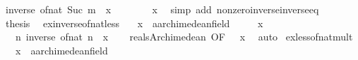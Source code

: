 \begin{isabellebody}
\ {\isachardoublequoteopen}inverse\ {\isacharparenleft}{\kern0pt}of{\isacharunderscore}{\kern0pt}nat\ {\isacharparenleft}{\kern0pt}Suc\ m{\isacharparenright}{\kern0pt}{\isacharparenright}{\kern0pt}\ {\isacharless}{\kern0pt}\ x{\isachardoublequoteclose}\isanewline
\ \ \ \ \isamarkupfalse%
\ {\isacartoucheopen}{}\ {\isacharless}{\kern0pt}\ x{\isacartoucheclose}\ \isamarkupfalse%
\ {\isacharparenleft}{\kern0pt}simp\ add{\isacharcolon}{\kern0pt}\ nonzero{\isacharunderscore}{\kern0pt}inverse{\isacharunderscore}{\kern0pt}inverse{\isacharunderscore}{\kern0pt}eq{\isacharparenright}{\kern0pt}\isanewline
\ \ \isamarkupfalse%
\ \isamarkupfalse%
\ {\isacharquery}{\kern0pt}thesis\ \isacommand{{\isachardot}{\kern0pt}{\isachardot}{\kern0pt}}\isamarkupfalse%
\isanewline
{}\isamarkupfalse%
%
\endisatagproof
{\isafoldproof}%
%
\isadelimproof
\isanewline
%
\endisadelimproof
\isanewline
{}\isamarkupfalse%
\ ex{\isacharunderscore}{\kern0pt}inverse{\isacharunderscore}{\kern0pt}of{\isacharunderscore}{\kern0pt}nat{\isacharunderscore}{\kern0pt}less{\isacharcolon}{\kern0pt}\isanewline
\ \ \ x\ {\isacharcolon}{\kern0pt}{\isacharcolon}{\kern0pt}\ {\isachardoublequoteopen}{\isacharprime}{\kern0pt}a{\isacharcolon}{\kern0pt}{\isacharcolon}{\kern0pt}archimedean{\isacharunderscore}{\kern0pt}field{\isachardoublequoteclose}\isanewline
\ \ \ {\isachardoublequoteopen}{}\ {\isacharless}{\kern0pt}\ x{\isachardoublequoteclose}\isanewline
\ \ \ {\isachardoublequoteopen}{\isasymexists}n{\isachargreater}{\kern0pt}{}{\isachardot}{\kern0pt}\ inverse\ {\isacharparenleft}{\kern0pt}of{\isacharunderscore}{\kern0pt}nat\ n{\isacharparenright}{\kern0pt}\ {\isacharless}{\kern0pt}\ x{\isachardoublequoteclose}\isanewline
%
\isadelimproof
\ \ %
\endisadelimproof
%
\isatagproof
{}\isamarkupfalse%
\ reals{\isacharunderscore}{\kern0pt}Archimedean\ {\isacharbrackleft}{\kern0pt}OF\ {\isacartoucheopen}{}\ {\isacharless}{\kern0pt}\ x{\isacartoucheclose}{\isacharbrackright}{\kern0pt}\ \isamarkupfalse%
\ auto%
\endisatagproof
{\isafoldproof}%
%
\isadelimproof
\isanewline
%
\endisadelimproof
\isanewline
{}\isamarkupfalse%
\ ex{\isacharunderscore}{\kern0pt}less{\isacharunderscore}{\kern0pt}of{\isacharunderscore}{\kern0pt}nat{\isacharunderscore}{\kern0pt}mult{\isacharcolon}{\kern0pt}\isanewline
\ \ \ x\ {\isacharcolon}{\kern0pt}{\isacharcolon}{\kern0pt}\ {\isachardoublequoteopen}{\isacharprime}{\kern0pt}a{\isacharcolon}{\kern0pt}{\isacharcolon}{\kern0pt}archimedean{\isacharunderscore}{\kern0pt}field{\isachardoublequoteclose}\isanewline

\end{isabellebody}
